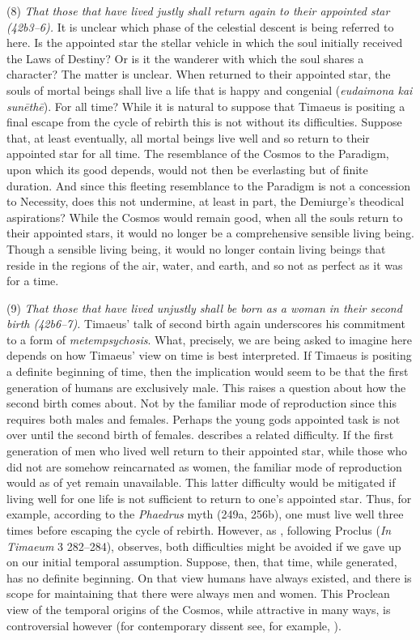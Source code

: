 (8) \emph{That those that have lived justly shall return again to their appointed star (42b3--6).} It is unclear which phase of the celestial descent is being referred to here. Is the appointed star the stellar vehicle in which the soul initially received the Laws of Destiny? Or is it the wanderer with which the soul shares a character? The matter is unclear. When returned to their appointed star, the souls of mortal beings shall live a life that is happy and congenial (\emph{eudaimona kai sunēthē}). For all time? While it is natural to suppose that Timaeus is positing a final escape from the cycle of rebirth this is not without its difficulties. Suppose that, at least eventually, all mortal beings live well and so return to their appointed star for all time. The resemblance of the Cosmos to the Paradigm, upon which its good depends, would not then be everlasting but of finite duration. And since this fleeting resemblance to the Paradigm is not a concession to Necessity, does this not undermine, at least in part, the Demiurge's theodical aspirations? While the Cosmos would remain good, when all the souls return to their appointed stars, it would no longer be a comprehensive sensible living being. Though a sensible living being, it would no longer contain living beings that reside in the regions of the air, water, and earth, and so not as perfect as it was for a time.

(9) \emph{That those that have lived unjustly shall be born as a woman in their second birth (42b6--7).} Timaeus' talk of second birth again underscores his commitment to a form of \emph{metempsychosis}. What, precisely, we are being asked to imagine here depends on how Timaeus' view on time is best interpreted. If Timaeus is positing a definite beginning of time, then the implication would seem to be that the first generation of humans are exclusively male. This raises a question about how the second birth comes about. Not by the familiar mode of reproduction since this requires both males and females. Perhaps the young gods appointed task is not over until the second birth of females. \citet[261]{Taylor:1928qb} describes a related difficulty. If the first generation of men who lived well return to their appointed star, while those who did not are somehow reincarnated as women, the familiar mode of reproduction would as of yet remain unavailable. This latter difficulty would be mitigated if living well for one life is not sufficient to return to one's appointed star. Thus, for example, according to the \emph{Phaedrus} myth (249a, 256b), one must live well three times before escaping the cycle of rebirth. However, as \citet[145--6]{Cornford:1935fk}, following Proclus (\emph{In Timaeum} 3 282--284), observes, both difficulties might be avoided if we gave up on our initial temporal assumption. Suppose, then, that time, while generated, has no definite beginning. On that view humans have always existed, and there is scope for maintaining that there were always men and women. This Proclean view of the temporal origins of the Cosmos, while attractive in many ways, is controversial however (for contemporary dissent see, for example, \citealt[chapter 2]{Mohr:2005xe}).

